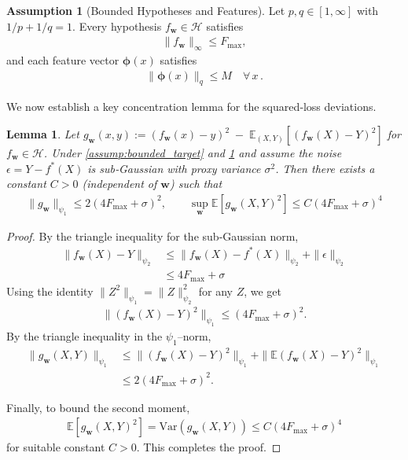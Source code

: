 \documentclass{article}
\theoremstyle{plain}
\newtheorem{lemma}[theorem]{Lemma}
\theoremstyle{definition}
\newtheorem{assumption}[theorem]{Assumption}
\theoremstyle{remark}
\begin{document}
\begin{assumption}[Bounded Hypotheses and Features]\label{assump:bounded_H}
  Let $p,q\in[1,\infty]$ with $1/p+1/q=1$.  Every hypothesis $f_{\bm{w}}\in\mathcal{H}$ satisfies
  \begin{align*}
  \|f_{\bm{w}}\|_{\infty}\le F_{\max},
  \end{align*}
  and each feature vector $\boldsymbol{\phi}(x)$ satisfies
  \begin{align*}
  \|\boldsymbol{\phi}(x)\|_{q}\le M\quad\forall\,x\,. 
  \end{align*}
\end{assumption}

We now establish a key concentration lemma for the squared‐loss deviations.
\begin{lemma}
\label{lem:bounded_g}
Let 
\(g_{\bm w}(x,y) := (f_{\bm w}(x)-y)^2 \;-\; \mathbb{E}_{(X,Y)}\left[(f_{\bm w}(X)-Y)^2\right]\) for $f_{\bm w} \in \mathcal{H}$. Under \cref{assump:bounded_target} and \cref{assump:bounded_H} and 
assume the noise \(\epsilon = Y - f^*(X)\) is sub‐Gaussian with proxy variance \(\sigma^2\). Then there exists a constant \(C >0\) (independent of \(\bm w\)) such that
\begin{align*}
\|g_{\bm w}\|_{\psi_{1}}
\le 2(4F_{\max}+\sigma)^{2},
\qquad
\sup_{\bm w}\mathbb{E}\left[g_{\bm w}(X,Y)^{2}\right]
\le C(4F_{\max}+\sigma)^4
\end{align*}
\end{lemma}

\begin{proof}
By the triangle inequality for the sub‐Gaussian norm,
\begin{align*}
\|f_{\bm w}(X) - Y\|_{\psi_{2}}
&\le \|f_{\bm w}(X)-f^*(X)\|_{\psi_{2}}
   + \|\epsilon\|_{\psi_{2}}\\
&\le 4F_{\max} + \sigma
\end{align*}
Using the identity \(\|Z^2\|_{\psi_{1}} = \|Z\|_{\psi_{2}}^2\) for any $Z$, we get
\begin{align*}
\|(f_{\bm w}(X)-Y)^2\|_{\psi_{1}} \le (4F_{\max} + \sigma)^2.
\end{align*}
By the triangle inequality in the \(\psi_1\)–norm,
\begin{align*}
\|g_{\bm w}(X,Y)\|_{\psi_{1}}
&\le \|(f_{\bm w}(X)-Y)^2\|_{\psi_{1}}
     + \|\mathbb{E}(f_{\bm w}(X)-Y)^2\|_{\psi_{1}}\\
&\le 2(4F_{\max} + \sigma)^2.
\end{align*}

Finally, to bound the second moment,
\begin{align*}
\mathbb{E}\left[g_{\bm w}(X,Y)^2\right]= \mathrm{Var}\left(g_{\bm w}(X,Y)\right) \leq C(4F_{\max}+\sigma)^4
\end{align*}
for suitable constant \(C>0\). This completes the proof.
\end{proof}
\end{document}
